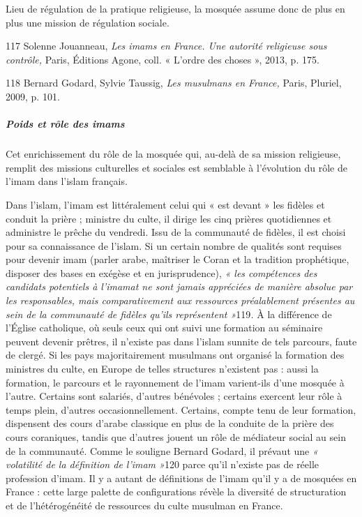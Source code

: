 Lieu de régulation de la pratique religieuse, la mosquée assume donc de
plus en plus une mission de régulation sociale.

117 Solenne Jouanneau, \emph{Les imams en France. Une autorité
religieuse sous contrôle,} Paris, Éditions Agone, coll. « L'ordre des
choses », 2013, p. 175.

118 Bernard Godard, Sylvie Taussig, \emph{Les musulmans en France,}
Paris, Pluriel, 2009, p. 101.




\hypertarget{poids-et-ruxf4le-des-imams}{%
\subparagraph{Poids et rôle des
imams}\label{poids-et-ruxf4le-des-imams}}


Cet enrichissement du rôle de la mosquée qui, au-delà de sa mission
religieuse, remplit des missions culturelles et sociales est semblable à
l'évolution du rôle de l'imam dans l'islam français.

Dans l'islam, l'imam est littéralement celui qui « est devant » les
fidèles et conduit la prière ; ministre du culte, il dirige les cinq
prières quotidiennes et administre le prêche du vendredi. Issu de la
communauté de fidèles, il est choisi pour sa connaissance de l'islam. Si
un certain nombre de qualités sont requises pour devenir imam (parler
arabe, maîtriser le Coran et la tradition prophétique, disposer des
bases en exégèse et en jurisprudence), \emph{« les compétences des
candidats potentiels à l'imamat ne sont jamais appréciées de manière
absolue par les responsables, mais comparativement aux ressources
préalablement présentes au sein de la communauté de fidèles qu'ils
représentent »}119\emph{.} À la différence de l'Église catholique, où
seuls ceux qui ont suivi une formation au séminaire peuvent devenir
prêtres, il n'existe pas dans l'islam sunnite de tels parcours, faute de
clergé. Si les pays majoritairement musulmans ont organisé la formation
des ministres du culte, en Europe de telles structures n'existent pas :
aussi la formation, le parcours et le rayonnement de l'imam varient-ils
d'une mosquée à l'autre. Certains sont salariés, d'autres bénévoles ;
certains exercent leur rôle à temps plein, d'autres occasionnellement.
Certains, compte tenu de leur formation, dispensent des cours d'arabe
classique en plus de la conduite de la prière des cours coraniques,
tandis que d'autres jouent un rôle de médiateur social au sein de la
communauté. Comme le souligne Bernard Godard, il prévaut une \emph{«
volatilité de la définition de l'imam »}120 parce qu'il n'existe pas de
réelle profession d'imam. Il y a autant de définitions de l'imam qu'il y
a de mosquées en France : cette large palette de configurations révèle
la diversité de structuration et de l'hétérogénéité de ressources du
culte musulman en France.

